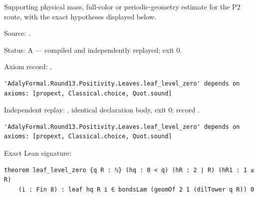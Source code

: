 \begin{theorem}[bp-444]
\label{bp-444}
\leanok
Supporting physical mass, full-color or periodic-geometry estimate for the P2 route, with the exact hypotheses displayed below.

\par Source: \texttt{}.
\par Status: A — compiled and independently replayed; exit 0.
\par Axiom record: \texttt{}.
\begin{verbatim}
'AdalyFormal.Round13.Positivity.Leaves.leaf_level_zero' depends on axioms: [propext, Classical.choice, Quot.sound]
\end{verbatim}
\par Independent replay: \texttt{}, identical declaration body, exit 0; record \texttt{}.
\begin{verbatim}
'AdalyFormal.Round13.Positivity.Leaves.leaf_level_zero' depends on axioms: [propext, Classical.choice, Quot.sound]
\end{verbatim}
\par Exact Lean signature:
\begin{verbatim}
theorem leaf_level_zero {q R : ℕ} (hq : 0 < q) (hR : 2 ∣ R) (hR1 : 1 ≤ R)
    (i : Fin 8) : leaf hq R i ∈ bondsLam (geomOf 2 1 (dilTower q R)) 0
\end{verbatim}
\end{theorem}

